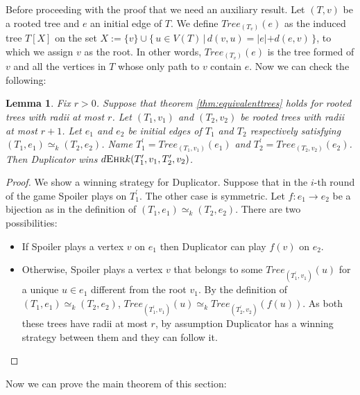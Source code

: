 \documentclass[12pt,notitlepage,a4paper]{article}
\newtheorem{lemma}{Lemma}[section]
\theoremstyle{definition}
\newcommand{\ehr}{\textsc{Ehr}}
\begin{document}
Before proceeding with the proof that we need an auxiliary
result. Let $(T,v)$ be a rooted tree and $e$ an 
initial edge of $T$. We define $Tree_{(T_v)}(e)$ as
the induced tree $T[X]$ on the set
$X:=\{v\} \cup \{\, u\in V(T) \, | \, d(v,u) = |e| + d(e,v) \,\}$,
to which we assign $v$ as the root. In other words, 
$Tree_{(T_v)}(e)$ is the tree formed of $v$ and all the vertices
in $T$ whose only path to $v$ contain $e$. 
Now we can check the following:

\begin{lemma} \label{lem:equivalentedges}
	Fix $r>0$. Suppose that theorem \ref{thm:equivalenttrees}
	holds for rooted trees with radii at most $r$.
	Let $(T_1,v_1)$ and $(T_2,v_2)$ be rooted trees with radii
	at most $r+1$. Let $e_1$ and $e_2$ be initial edges 
	of $T_1$ and $T_2$ respectively satisfying 
	$(T_1,e_1)\simeq_k (T_2,e_2)$. Name 
	$T^\prime_1=Tree_{(T_1,v_1)}(e_1)$ and 
	$T^\prime_2=Tree_{(T_2,v_2)}(e_2)$. Then
	Duplicator wins $d\ehr{k}(T^\prime_1, v_1, T^\prime_2,v_2)$.
\end{lemma}
\begin{proof}
	We show a winning strategy for Duplicator. 
	Suppose that in the $i$-th round of the game Spoiler
	plays on $T^\prime_1$. The other case is symmetric. Let
	$f:e_1\rightarrow e_2$ be a bijection as in the definition
	of $(T_1,e_1)\simeq_k (T_2,e_2)$. There are two possibilities:
	\begin{itemize}
		\item If Spoiler plays a vertex $v$ on $e_1$ 
		then Duplicator can play $f(v)$ on $e_2$. 
		\item Otherwise, Spoiler plays a vertex $v$ that belongs
		to some $Tree_{(T^\prime_1,v_1)}(u)$ for a unique $u\in e_1$
		different from the root $v_1$.
		By the definition of $(T_1,e_1)\simeq_k (T_2,e_2)$,
		$Tree_{(T^\prime_1,v_1)}(u)\simeq_k 
		Tree_{(T^\prime_2,v_2)}(f(u))$. As both these trees
		have radii at most $r$, by assumption Duplicator has a winning 
		strategy between them and they can follow it.		
	\end{itemize}
\end{proof}

Now we can prove the main theorem of this section:
\end{document}
